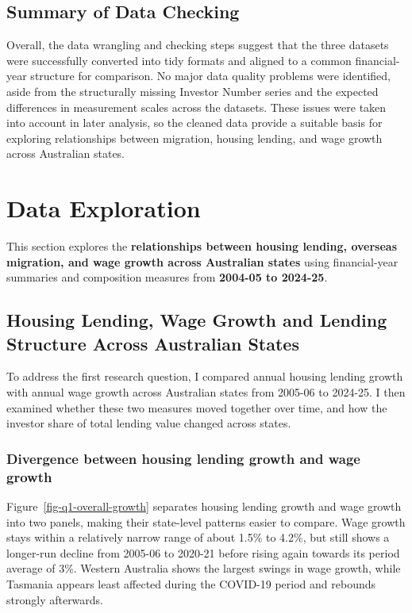 \documentclass[
  11pt,
  a4paper,
]{article}
\begin{document}
\subsection{Summary of Data Checking}\label{summary-of-data-checking}

Overall, the data wrangling and checking steps suggest that the three
datasets were successfully converted into tidy formats and aligned to a
common financial-year structure for comparison. No major data quality
problems were identified, aside from the structurally missing Investor
Number series and the expected differences in measurement scales across
the datasets. These issues were taken into account in later analysis, so
the cleaned data provide a suitable basis for exploring relationships
between migration, housing lending, and wage growth across Australian
states.

\section{Data Exploration}\label{data-exploration}

This section explores the \textbf{relationships between housing lending,
overseas migration, and wage growth across Australian states} using
financial-year summaries and composition measures from \textbf{2004-05
to 2024-25}.

\subsection{Housing Lending, Wage Growth and Lending Structure Across
Australian
States}\label{housing-lending-wage-growth-and-lending-structure-across-australian-states}

To address the first research question, I compared annual housing
lending growth with annual wage growth across Australian states from
2005-06 to 2024-25. I then examined whether these two measures moved
together over time, and how the investor share of total lending value
changed across states.

\subsubsection{Divergence between housing lending growth and wage
growth}\label{divergence-between-housing-lending-growth-and-wage-growth}

Figure~\ref{fig-q1-overall-growth} separates housing lending growth and
wage growth into two panels, making their state-level patterns easier to
compare. Wage growth stays within a relatively narrow range of about
1.5\% to 4.2\%, but still shows a longer-run decline from 2005-06 to
2020-21 before rising again towards its period average of 3\%. Western
Australia shows the largest swings in wage growth, while Tasmania
appears least affected during the COVID-19 period and rebounds strongly
afterwards.
\end{document}
